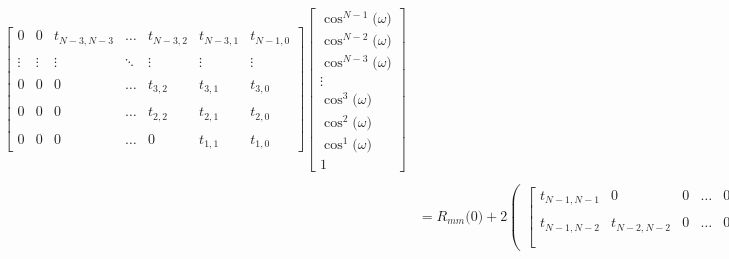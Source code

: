 \documentclass{article}
\begin{document}
\begin{align*}
\begin{bmatrix}
                                               0 &                0 & t_{N - 3, N - 3} & \ldots & t_{N - 3, 2} & t_{N - 3, 1} & t_{N - 1, 0} \\ \\
                                          \vdots &           \vdots &           \vdots & \ddots &       \vdots &       \vdots &       \vdots \\ \\
                                               0 &                0 &                0 & \ldots &     t_{3, 2} &     t_{3, 1} &     t_{3, 0} \\ \\
                                               0 &                0 &                0 & \ldots &     t_{2, 2} &     t_{2, 1} &     t_{2, 0} \\ \\
                                               0 &                0 &                0 & \ldots &            0 &     t_{1, 1} &     t_{1, 0} 
                              \end{bmatrix}
                            \begin{bmatrix}
                                \cos^{N - 1}\big(\omega\big) \\
                                \cos^{N - 2}\big(\omega\big) \\
                                \cos^{N - 3}\big(\omega\big) \\
                                \vdots \\
                                \cos^{3}\big(\omega\big) \\
                                \cos^{2}\big(\omega\big) \\
                                \cos^{1}\big(\omega\big) \\
                                1 
                              \end{bmatrix} \\ \\
    &= R_{mm}\big(0\big) + 2\begin{pmatrix}
                                \begin{bmatrix}
                                    t_{N - 1, N - 1} &                0 &                0 & \ldots &        0 &        0 &        0 \\ \\
                                    t_{N - 1, N - 2} & t_{N - 2, N - 2} &                0 & \ldots &        0 &        0 &        0 \\ \\

\end{bmatrix}
\end{pmatrix}
\end{align*}
\end{document}
